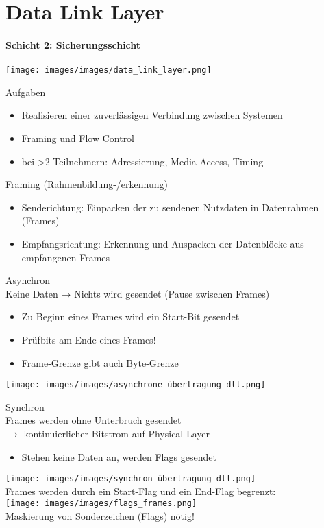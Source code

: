 \section{Data Link Layer}
\paragraph{Schicht 2: Sicherungsschicht}
\vspace{-1mm}
\texttt{[image: images/images/data\_link\_layer.png]}
\begin{definition}{Aufgaben}
    \begin{itemize}
        \item Realisieren einer zuverlässigen Verbindung zwischen Systemen
        \item Framing und Flow Control
        \item bei >2 Teilnehmern: Adressierung, Media Access, Timing
    \end{itemize}
\end{definition}

\begin{definition}{Framing (Rahmenbildung-/erkennung)}
    \begin{itemize}
        \item Senderichtung: Einpacken der zu sendenen Nutzdaten in Datenrahmen (Frames)
        \item Empfangsrichtung: Erkennung und Auspacken der Datenblöcke aus empfangenen Frames
    \end{itemize}
\end{definition}

\begin{concept}{Asynchron}\\
    Keine Daten → Nichts wird gesendet (Pause zwischen Frames)
    \begin{itemize}
        \item Zu Beginn eines Frames wird ein Start-Bit gesendet
        \item Prüfbits am Ende eines Frames!
        \item Frame-Grenze gibt auch Byte-Grenze
    \end{itemize}
    \texttt{[image: images/images/asynchrone\_übertragung\_dll.png]}
\end{concept}

\begin{concept}{Synchron}\\
    Frames werden ohne Unterbruch gesendet \\
    $\rightarrow$ kontinuierlicher Bitstrom auf Physical Layer
    \begin{itemize}
        \item Stehen keine Daten an, werden Flags gesendet
    \end{itemize}
    \texttt{[image: images/images/synchron\_übertragung\_dll.png]}\\
    Frames werden durch ein Start-Flag und ein End-Flag begrenzt:\\
    \texttt{[image: images/images/flags\_frames.png]}\\
    Maskierung von Sonderzeichen (Flags) nötig!
\end{concept}

